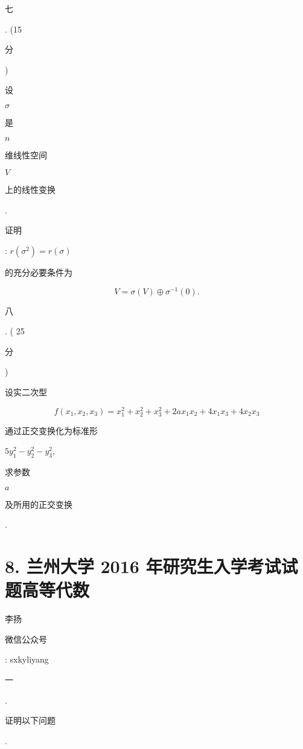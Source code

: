 \documentclass[10pt]{article}
\begin{document}
\begin{CJK}{UTF8}{mj}七\end{CJK}. (15 \begin{CJK}{UTF8}{mj}分\end{CJK}) \begin{CJK}{UTF8}{mj}设\end{CJK} $\sigma$ \begin{CJK}{UTF8}{mj}是\end{CJK} $n$ \begin{CJK}{UTF8}{mj}维线性空间\end{CJK} $V$ \begin{CJK}{UTF8}{mj}上的线性变换\end{CJK}. \begin{CJK}{UTF8}{mj}证明\end{CJK}: $r\left(\sigma^{2}\right)=r(\sigma)$ \begin{CJK}{UTF8}{mj}的充分必要条件为\end{CJK}
$$
V=\sigma(V) \oplus \sigma^{-1}(0) .
$$
\begin{CJK}{UTF8}{mj}八\end{CJK}. ( 25 \begin{CJK}{UTF8}{mj}分\end{CJK}) \begin{CJK}{UTF8}{mj}设实二次型\end{CJK}
$$
f\left(x_{1}, x_{2}, x_{3}\right)=x_{1}^{2}+x_{2}^{2}+x_{3}^{2}+2 a x_{1} x_{2}+4 x_{1} x_{3}+4 x_{2} x_{3}
$$
\begin{CJK}{UTF8}{mj}通过正交变换化为标准形\end{CJK} $5 y_{1}^{2}-y_{2}^{2}-y_{3}^{2}$, \begin{CJK}{UTF8}{mj}求参数\end{CJK} $a$ \begin{CJK}{UTF8}{mj}及所用的正交变换\end{CJK}.

\section{8. 兰州大学 2016 年研究生入学考试试题高等代数}
\begin{CJK}{UTF8}{mj}李扬\end{CJK}

\begin{CJK}{UTF8}{mj}微信公众号\end{CJK}: sxkyliyang

\begin{CJK}{UTF8}{mj}一\end{CJK}. \begin{CJK}{UTF8}{mj}证明以下问题\end{CJK}.
\end{document}
